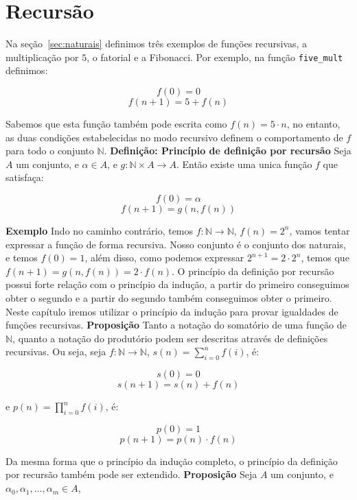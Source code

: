 \section{Recursão}
\label{sec:recursao}

Na seção~\ref{sec:naturais} definimos três exemplos de funções recursivas, a multiplicação por $5$, o fatorial e a Fibonacci.
Por exemplo, na função \lstinline{five_mult} definimos:
\begin{center}
    \[ f(0) = 0 \] 
    \[ f(n+1) = 5 + f(n) \]
\end{center}
Sabemos que esta função também pode escrita como $f(n) = 5\cdot n$, no entanto, as duas condições estabelecidas
no modo recursivo definem o comportamento de $f$ para todo o conjunto $\mathbb{N}$.
\newline \textbf{Definição: Princípio de definição por recursão} Seja $A$ um conjunto, e $\alpha \in A$,
e $g : \mathbb{N} \times A \to A$. Então existe uma unica função $f$ que satisfaça:
\begin{center}
    \[ f(0) = \alpha \]
    \[ f(n+1) = g(n, f(n))\]
\end{center} 
\textbf{Exemplo} Indo no caminho contrário, temos $f : \mathbb{N} \to \mathbb{N}$, $f(n) = 2^n$, vamos
tentar expressar a função de forma recursiva. Nosso conjunto é o conjunto dos naturais, e temos $f(0) = 1$,
além disso, como podemos expressar $2^{n+1} = 2\cdot 2^{n}$, temos que $f(n+1) = g(n, f(n)) = 2\cdot f(n)$.
\newline O princípio da definição por recursão possui forte relação com o princípio da indução, a partir do
primeiro conseguimos obter o segundo e a partir do segundo também conseguimos obter o primeiro. Neste capítulo
iremos utilizar o princípio da indução para provar igualdades de funções recursivas. 
\newline \textbf{Proposição} Tanto a notação do somatório de uma função de $\mathbb{N}$, quanto a notação
do produtório podem ser descritas através de definições recursivas. Ou seja, seja $f : \mathbb{N} \to 
\mathbb{N}$, $s(n) = \sum_{i=0}^{n} f(i)$, é:
\begin{center}
    \[ s(0) = 0\]
    \[s(n+1)=s(n)+f(n)\]
\end{center}
e $p(n) = \prod_{i=0}^n f(i)$, é:
\begin{center}
    \[ p(0) = 1\]
    \[ p(n+1)=p(n)\cdot f(n)\]
\end{center}
Da mesma forma que o princípio da indução completo, o princípio da definição por recursão também pode ser
extendido.
\newline \textbf{Proposição} Seja $A$ um conjunto, e $\alpha_0, \alpha_1, \dots, \alpha_m \in A$,
